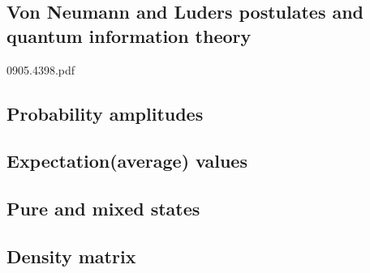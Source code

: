 \documentclass{article}
\begin{document}
\subsection{Von Neumann and Luders postulates and quantum information theory}
0905.4398.pdf



\subsection{Probability amplitudes}



\subsection{Expectation(average) values}













\subsection{Pure and mixed states}








\subsection{Density matrix}
\end{document}
